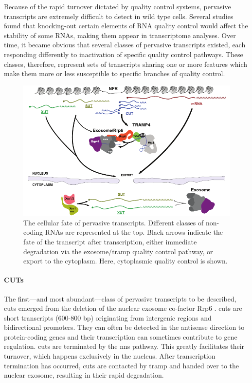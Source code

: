 Because of the rapid turnover dictated by quality control systems, pervasive transcripts are extremely difficult to detect in wild type cells.
Several studies found that knocking-out certain elements of RNA quality control would affect the stability of some RNAs, making them appear in transcriptome analyses.
Over time, it became obvious that several classes of pervasive transcripts existed, each responding differently to inactivation of specific quality control pathways.
These classes, therefore, represent sets of transcripts sharing one or more features which make them more or less susceptible to specific branches of quality control.

\begin{figure}[ht]

\centering
\includegraphics[width=\textwidth]{figures/introduction/pervasiveTr}
\caption[Classes of transcripts and their fates.]{The cellular fate of pervasive transcripts. Different classes of non-coding RNAs are represented at the top. Black arrows indicate the fate of the transcript after transcription, either immediate degradation via the exosome/\gls{tramp} quality control pathway, or export to the cytoplasm. Here, cytoplasmic quality control is shown.}
\label{fig:nnsTermination}

\end{figure}

\paragraph{CUTs}

The first---and most abundant---class of pervasive transcripts to be described, \gls{cuts} emerged from the deletion of the nuclear exosome co-factor Rrp6 \cite{wyers:2005:cryptic}.
\gls{cuts} are short transcripts (600-800 bp) originating from intergenic regions and bidirectional promoters.
They can often be detected in the antisense direction to protein-coding genes and their transcription can sometimes contribute to gene regulation.
\gls{cuts} are terminated by the \gls{nns} pathway.
This greatly facilitates their turnover, which happens exclusively in the nucleus.
After transcription termination has occurred, \gls{cuts} are contacted by \gls{tramp} and handed over to the nuclear exosome, resulting in their rapid degradation. 

